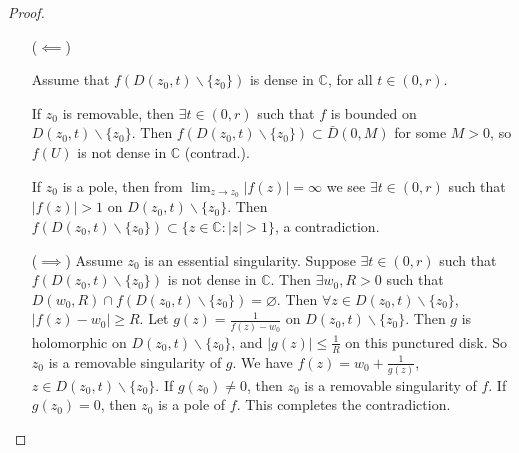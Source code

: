 \begin{proof}
\begin{itemize}
  \item[($\impliedby$)]{
    Assume that $f(D(z_0, t) \backslash \{ z_0 \})$ is dense in
    $\mathbb{C}$, for all $t \in (0, r)$.

    If $z_0$ is
    removable, then $\exists t \in (0, r)$ such that $f$ is
    bounded on $D(z_0, t) \backslash \{ z_0 \}$. Then
    $f(D(z_0, t) \backslash \{ z_0 \}) \subset \bar{D}(0, M)$
    for some $M > 0$, so $f(U)$ is not dense in $\mathbb{C}$
    (contrad.).

    If $z_0$ is a pole, then from
    $\lim_{z \to z_0} |f(z)| = \infty$ we see $\exists t \in (0, r)$
    such that $|f(z)| > 1$ on $D(z_0, t) \backslash \{ z_0 \}$.
    Then $f(D(z_0, t) \backslash \{ z_0 \})
    \subset \{ z \in \mathbb{C} : |z| > 1 \}$, a contradiction.
  }
  \item[($\implies$)]{
    Assume $z_0$ is an essential singularity. Suppose $\exists t \in
    (0, r)$ such that $f(D(z_0, t) \backslash \{ z_0 \})$ is not dense
    in $\mathbb{C}$. Then $\exists w_0, R > 0$ such that
    $
    D(w_0, R) \cap f(D(z_0, t) \backslash \{ z_0 \}) = \varnothing.
    $
    Then $\forall z \in D(z_0, t) \backslash \{ z_0 \}$,
    $|f(z) - w_0| \geq R$. Let $g(z) = \frac{1}{f(z) - w_0}$ on
    $D(z_0, t) \backslash \{ z_0 \}$. Then $g$ is holomorphic on
    $D(z_0, t) \backslash \{ z_0 \}$, and $|g(z)| \leq \frac{1}{R}$ on
    this punctured disk. So $z_0$ is a removable singularity of $g$.
    We have $f(z) = w_0 + \frac{1}{g(z)}$, $z \in D(z_0, t) \backslash
    \{ z_0 \}$. If $g(z_0) \neq 0$, then $z_0$ is a removable
    singularity of $f$. If $g(z_0) = 0$, then $z_0$ is a pole of $f$.
    This completes the contradiction.
  }
\end{itemize}
\end{proof}
